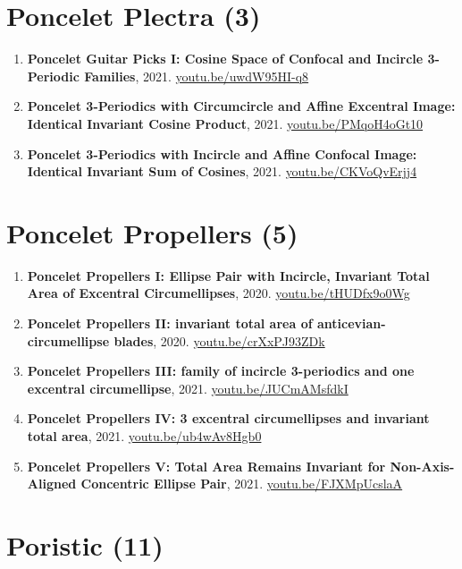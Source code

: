 \documentclass[12pt]{article}
\begin{document}
\section{Poncelet Plectra (3)}

\begin{enumerate}[resume]
\item \textbf{Poncelet Guitar Picks I: Cosine Space of Confocal and Incircle 3-Periodic Families}, 2021. \href{https://youtu.be/uwdW95HI-q8}{\url{youtu.be/uwdW95HI-q8}}
\item \textbf{Poncelet 3-Periodics with Circumcircle and Affine Excentral Image: Identical Invariant Cosine Product}, 2021. \href{https://youtu.be/PMqoH4oGt10}{\url{youtu.be/PMqoH4oGt10}}
\item \textbf{Poncelet 3-Periodics with Incircle and Affine Confocal Image: Identical Invariant Sum of Cosines}, 2021. \href{https://youtu.be/CKVoQvErjj4}{\url{youtu.be/CKVoQvErjj4}}
\end{enumerate}

\section{Poncelet Propellers (5)}

\begin{enumerate}[resume]
\item \textbf{Poncelet Propellers I: Ellipse Pair with Incircle, Invariant Total Area of Excentral Circumellipses}, 2020. \href{https://youtu.be/tHUDfx9o0Wg}{\url{youtu.be/tHUDfx9o0Wg}}
\item \textbf{Poncelet Propellers II: invariant total area of anticevian-circumellipse blades}, 2020. \href{https://youtu.be/crXxPJ93ZDk}{\url{youtu.be/crXxPJ93ZDk}}
\item \textbf{Poncelet Propellers III: family of incircle 3-periodics and one excentral circumellipse}, 2021. \href{https://youtu.be/JUCmAMsfdkI}{\url{youtu.be/JUCmAMsfdkI}}
\item \textbf{Poncelet Propellers IV: 3 excentral circumellipses and invariant total area}, 2021. \href{https://youtu.be/ub4wAv8Hgb0}{\url{youtu.be/ub4wAv8Hgb0}}
\item \textbf{Poncelet Propellers V: Total Area Remains Invariant for Non-Axis-Aligned Concentric Ellipse Pair}, 2021. \href{https://youtu.be/FJXMpUcslaA}{\url{youtu.be/FJXMpUcslaA}}
\end{enumerate}

\section{Poristic (11)}
\end{document}
